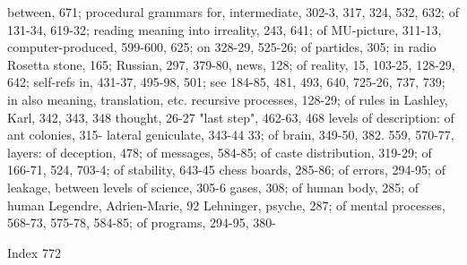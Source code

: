 between, 671; procedural grammars for,          intermediate, 302-3, 317, 324, 532, 632; of
131-34, 619-32; reading meaning into            irreality, 243, 641; of MU-picture, 311-13,
computer-produced, 599-600, 625; on             328-29, 525-26; of partides, 305; in radio
Rosetta stone, 165; Russian, 297, 379-80,       news, 128; of reality, 15, 103-25, 128-29,
642; self-refs in, 431-37, 495-98, 501; see     184-85, 481, 493, 640, 725-26, 737, 739; in
also meaning, translation, etc.                 recursive processes, 128-29; of rules in
Lashley, Karl, 342, 343, 348                    thought, 26-27
"last step", 462-63, 468                        levels of description: of ant colonies, 315-
lateral geniculate, 343-44                      33; of brain, 349-50, 382. 559, 570-77,
layers: of deception, 478; of messages,         584-85; of caste distribution, 319-29; of
166-71, 524, 703-4; of stability, 643-45        chess boards, 285-86; of errors, 294-95; of
leakage, between levels of science, 305-6       gases, 308; of human body, 285; of human
Legendre, Adrien-Marie, 92 Lehninger,           psyche, 287; of mental processes, 568-73,
                                                575-78, 584-85; of programs, 294-95, 380-



Index                                                                                   772

